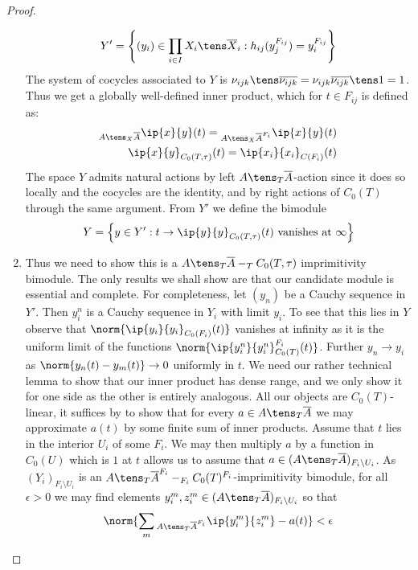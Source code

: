 \begin{proof}
\begin{enumerate}
	\begin{align*}
		Y'=\left \{ (y_i)\in \prod_{i\in I} X_i\tens \overline{X}_i: h_{ij}(y_{j}^{F_{ij}})=y_i^{F_{ij}} \right \}
	\end{align*}
	The system of cocycles associated to $Y$ is $\nu_{ijk}\tens \overline{\nu_{ijk}}=\nu_{ijk} \overline{\nu_{ijk}}\tens 1=1$. Thus we get a globally well-defined inner product, which for $t\in F_{ij}$ is defined as:
	\begin{align*}
		{}_{A\tens_X \overline{A}}\ip{x}{y}(t)={}_{{A\tens_X \overline{A}}^{F_i}}\ip{x}{y}(t) \\
		\ip{x}{y}_{C_0(T,\tau)}(t)=\ip{x_i}{x_i}_{C(F_i)}(t)
	\end{align*}
	The space $Y$ admits natural actions by left $A\tens_T \overline{A}$-action since it does so locally and the cocycles are the identity, and by right actions of $C_0(T)$ through the same argument.
	From $Y'$  we define the bimodule 
	\begin{align*}
		Y=\left \{ y\in Y' : t\to \ip{y}{y}_{C_0(T,\tau)}(t) \text{ vanishes at } \infty \right \}
	\end{align*}
\item
	Thus we need to show this is a $A\tens_T \overline{A}-_TC_0(T,\tau)$ imprimitivity bimodule. 
	The only results we shall show are that our candidate module is essential and complete. For completeness, let $(y_n)$ be a Cauchy sequence in $Y'$. Then $y_i^n$ is a Cauchy sequence in $Y_i$ with limit $y_i$. To see that this lies in $Y$ observe that $\norm{\ip{y_i}{y_i}_{C_0(F_i)}(t)}$ vanishes at infinity as it is the uniform limit of the functions $\norm{\ip{y_i^n}{y_i^n}_{C_0(T)}^{F_i}(t)}$. Further $y_n\to y_i$ as $\norm{y_n(t)-y_m(t)}\to 0$ uniformly in $t$. We need our rather technical lemma to show that our inner product has dense range, and we only show it for one side as the other is entirely analogous. 
	All our objects are $C_0(T)$-linear, it suffices by  to show that for every $a\in A\tens_T \overline{A}$ we may approximate $a(t)$ by some finite sum of inner products. Assume that $t$ lies in the interior $U_i$ of some $F_i$. We may then multiply $a$ by a function in $C_0(U)$ which is $1$ at $t$ allows us to assume that $a\in  (A\tens_T \overline{A})_{F_i\setminus U_i}$. As $(Y_i)_{F_i\setminus U_i}$ is an $A\tens_T \overline{A}^{F_i}-_{F_i} C_0(T)^{F_i}$-imprimitivity bimodule, for all $\epsilon>0$ we may find elements $y_i^m,z_i^m \in (A\tens_T \overline{A})_{F_i\setminus U_i}$ so that
	\begin{align*}
		\norm{\sum_m{}_{A\tens_T \overline{A}^{F_i}}\ip{y_i^m}{z_i^m}-a(t)}<\epsilon

\end{align*}
\end{enumerate}
\end{proof}
